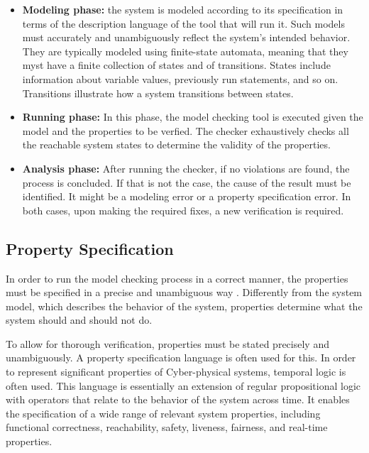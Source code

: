 \begin{itemize}
    \item \textbf{Modeling phase:} the system is modeled according to its specification in terms of the description language of the tool that will run it. Such models must accurately and unambiguously reflect the system's intended behavior. They are typically modeled using finite-state automata, meaning that they myst have a finite collection of states and of transitions. States include information about variable values, previously run statements, and so on. Transitions illustrate how a system transitions between states. 
    
	\item \textbf{Running phase:} In this phase, the model checking tool is executed given the model and the properties to be verfied. The checker exhaustively checks all the reachable system states to determine the validity of the properties.
	
	\item \textbf{Analysis phase:} After running the checker, if no violations are found, the process is concluded. If that is not the case, the cause of the result must be identified. It might be a modeling error or a property specification error. In both cases, upon making the required fixes, a new verification is required.
    
\end{itemize}

\subsection{Property Specification}

In order to run the model checking process in a correct manner, the properties must be specified in a precise and unambiguous way \cite{2008PrinciplesModelChecking}. Differently from the system model, which describes the behavior of the system, properties determine what the system should and should not do.

To allow for thorough verification, properties must be stated precisely and unambiguously. A property specification language is often used for this. In order to represent significant properties of Cyber-physical systems, temporal logic is often used. This language is essentially an extension of regular propositional logic with operators that relate to the behavior of the system across time. It enables the specification of a wide range of relevant system properties, including functional correctness, reachability, safety, liveness, fairness, and real-time properties.


